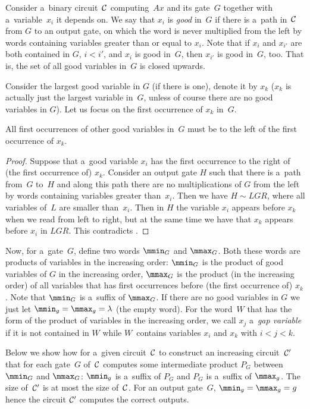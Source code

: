 Consider a~binary circuit~${\cal C}$ computing~$Ax$ and its gate~$G$ together with a~variable~$x_i$ it depends on.
We say that $x_i$ is \emph{good} in~$G$ if there is
a~path in~${\cal C}$ from $G$ to an output gate, on which the word is never multiplied from the left by words containing variables greater than or equal to $x_i$.
Note that if $x_i$ and $x_{i'}$ are both contained in $G$, $i<i'$, and $x_i$ is good in~$G$, then $x_{i'}$ is good in~$G$, too. That is, the set of all good variables in~$G$ is closed upwards.

Consider the largest good variable in $G$ (if there is one), denote it by $x_k$ ($x_k$ is actually just the largest variable in~$G$, unless of course there are no good variables in $G$). Let us focus on the first occurrence of $x_k$ in~$G$.

\begin{claim}
    All first occurrences of other good variables in~$G$ must be to the left of the first occurrence of $x_k$.
\end{claim}

\begin{proof}
    Suppose that a~good variable $x_i$ has the first occurrence to the right of (the first occurrence of) $x_k$. Consider an output gate $H$ such that there is a~path from~$G$ to~$H$ and along this path there are no multiplications of $G$ from the left by words containing variables greater than~$x_i$. Then we have $H \sim LGR$, where all variables of~$L$ are smaller than~$x_i$. Then in $H$ the variable $x_i$ appears before $x_k$ when we read from left to right, but at the same time we have that $x_k$ appears before $x_i$ in $LGR$. This contradicts .
\end{proof}

Now, for a~gate~$G$, define two words $\mmin_G$ and $\mmax_G$. Both these words are products of variables in the increasing order: $\mmin_G$ is the product of good variables of $G$ in the increasing order, $\mmax_G$ is the product (in the increasing order) of all variables that has first occurrences before (the first occurrence of) $x_k$. Note that $\mmin_G$ is
a~suffix of $\mmax_G$. If there are no good variables in $G$ we just let $\mmin_g=\mmax_g=\lambda$ (the empty word).
%
For the word~$W$ that has the form of the product of variables in the increasing order, we call $x_j$ a~\emph{gap variable} if it is not contained in $W$
while $W$~contains variables $x_i$ and $x_k$ with $i < j < k$.

Below we show how for a~given circuit~${\cal C}$ to construct an increasing circuit~${\cal C}'$ that for each gate~$G$ of~${\cal C}$ computes some intermediate product $P_G$ between $\mmin_G$ and $\mmax_G$: $\mmin_g$ is a~suffix of $P_G$ and $P_G$ is a~suffix of $\mmax_g$. The size of~${\cal C}'$ is at most the size of~${\cal C}$. For an output gate~$G$, $\mmin_g=\mmax_g=g$ hence the circuit ${\cal C}'$ computes the correct outputs.

